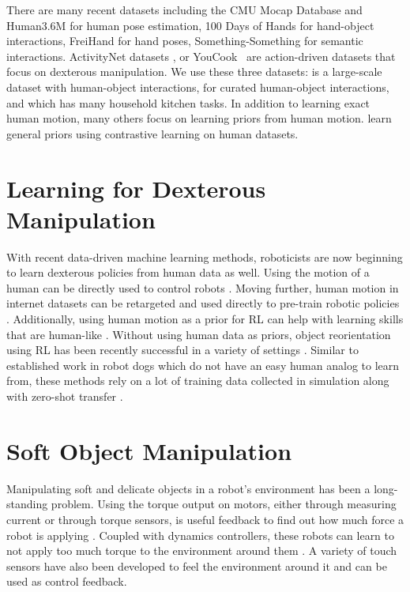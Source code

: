There are many recent datasets including the CMU Mocap Database and Human3.6M \citep{ionescu2013human3} for human pose estimation, 100 Days of Hands \citep{100doh} for hand-object interactions,  FreiHand \citep{Freihand2019} for hand poses, Something-Something \citep{SomethingSomething_ICCV} for semantic interactions. ActivityNet datasets \citep{caba2015activitynet}, or YouCook~\citep{youcook} are action-driven datasets that focus on dexterous manipulation.  We use these three datasets: \citep{ego4d} is a large-scale dataset with human-object interactions, \citep{Liu_2022_CVPR} for curated human-object interactions, and \citep{EPICKITCHENS} which has many household kitchen tasks.  In addition to learning exact human motion, many others focus on learning priors from human motion. \cite{ma2022vip, nair2022r3m} learn general priors using contrastive learning on human datasets. 

\section{Learning for Dexterous Manipulation}
With recent data-driven machine learning methods, roboticists are now beginning to learn dexterous policies from human data as well.  Using the motion of a human can be directly used to control robots \citep{dexpilot, sivakumar2022robotic, qin2022from}. Moving further, human motion in internet datasets can be retargeted and used directly to pre-train robotic policies \citep{shaw2022video, mandikal2022dexvip}. Additionally, using human motion as a prior for RL can help with learning skills that are human-like \cite{rajeswaran2017learning, peng2018deepmimic, mandikal2021dexvip}. Without using human data as priors, object reorientation using RL has been recently successful in a variety of settings  \citep{andrychowicz2020learning, chen2022visual}.  Similar to established work in robot dogs which do not have an easy human analog to learn from, these methods rely on a lot of training data collected in simulation along with zero-shot transfer \citep{agarwal2023legged, margolis2022rapid}.

\section{Soft Object Manipulation}
Manipulating soft and delicate objects in a robot's environment has been a long-standing problem. Using the torque output on motors, either through measuring current or through torque sensors, is useful feedback to find out how much force a robot is applying \cite{yoshikawa1985dynamic, asada1991robot}.  Coupled with dynamics controllers, these robots can learn to not apply too much torque to the environment around them \cite{lynch2017modern, liu2017designing, khatib1987unified}.   A variety of touch sensors \cite{si2023robotsweater, yuan2017gelsight, bhirangi2021reskin, SSundaram:2019:STAG} have also been developed to  feel the environment around it and can be used as control feedback.  

